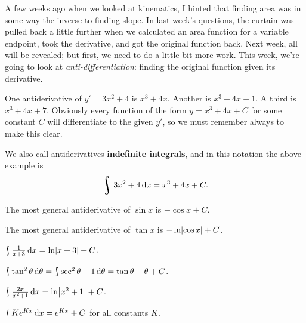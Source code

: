 


A few weeks ago when we looked at kinematics, I hinted that finding area was in some way the inverse to finding slope. In last
week's questions, the curtain was pulled back a little further when we calculated an area function for a variable endpoint, took
the derivative, and got the original function back. Next week, all will be revealed; but first, we need to do a little bit more
work. This week, we're going to look at \textit{anti-differentiation}: finding the original function given its derivative.

\begin{ex}
  One antiderivative of $ y' = 3x^2 + 4 $ is $ x^3 + 4x $. Another is $ x^3 + 4x + 1 $. A third is $ x^3 + 4x + 7 $. Obviously
  every function of the form $ y = x^3 + 4x + C $ for some constant $ C $ will differentiate to the given $ y' $, so we must remember
  always to make this clear.
\end{ex}

We also call antiderivatives \textbf{indefinite integrals}, and in this notation the above example is
\begin{displaymath}
  \rint 3x^2 + 4 \dif{x} = x^3 + 4x + C.
\end{displaymath}

\begin{ex}
  The most general antiderivative of $ \sin x $ is $ -\cos x + C $.
\end{ex}

\begin{ex}
  The most general antiderivative of $ \tan x $ is $ -\ln \abs{\cos x} + C $.
\end{ex}

\begin{ex}
  $ \rint \frac{1}{x + 3} \dif{x} = \ln \abs{x + 3} + C $.
\end{ex}

\begin{ex}
  $ \rint \tan^2 \theta \dif{\theta} = \rint \sec^2 \theta - 1 \dif{\theta} = \tan \theta - \theta + C $.
\end{ex}

\begin{ex}
  $ \rint \frac{2x}{x^2 + 1} \dif{x} = \ln \abs{x^2 + 1} + C $.
\end{ex}

\begin{ex}
  $ \rint Ke^{Kx} \dif{x} = e^{Kx} + C $ for all constants $ K $.
\end{ex}

